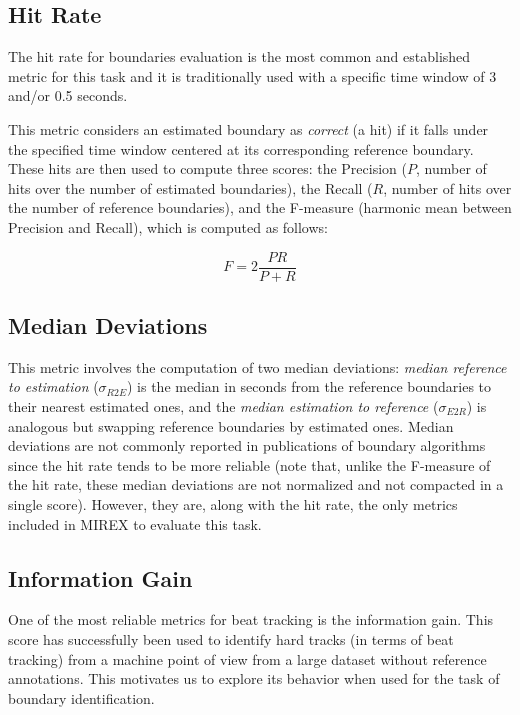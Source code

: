 \documentclass{article}
\begin{document}
\subsection{Hit Rate}\label{subsec:hitrate}

The hit rate for boundaries evaluation is the most common and established metric for this task and it is traditionally used with a specific time window of 3 and/or 0.5 seconds\cite{Ong2005}. 

This metric considers an estimated boundary as \emph{correct} (a hit) if it falls under the specified time window centered at its corresponding reference boundary.
These hits are then used to compute three scores: the Precision ($P$, number of hits over the number of estimated boundaries), the Recall ($R$, number of hits over the number of reference boundaries), and the F-measure (harmonic mean between Precision and Recall), which is computed as follows:

\begin{equation}
  F = 2 \frac{P R}{P + R}
\end{equation}

\subsection{Median Deviations}

This metric involves the computation of two median deviations: \emph{median reference to estimation} ($\sigma_{R2E}$) is the median in seconds from the reference boundaries to their nearest estimated ones, and the \emph{median estimation to reference} ($\sigma_{E2R}$) is analogous but swapping reference boundaries by estimated ones\cite{Pampalk}.
Median deviations are not commonly reported in publications of boundary algorithms since the hit rate tends to be more reliable (note that, unlike the F-measure of the hit rate, these median deviations are not normalized and not compacted in a single score).
However, they are, along with the hit rate, the only metrics included in MIREX to evaluate this task.

\subsection{Information Gain}

One of the most reliable metrics for beat tracking is the information gain\cite{Davies2009}. 
This score has successfully been used to identify hard tracks (in terms of beat tracking) from a machine point of view from a large dataset without reference annotations\cite{Holzapfel2012}.
This motivates us to explore its behavior when used for the task of boundary identification.
\end{document}
